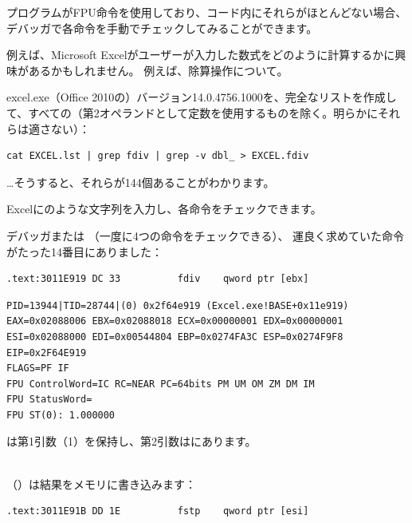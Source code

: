 
プログラムがFPU命令を使用しており、コード内にそれらがほとんどない場合、
デバッガで各命令を手動でチェックしてみることができます。

\par 例えば、Microsoft Excelがユーザーが入力した数式をどのように計算するかに興味があるかもしれません。
例えば、除算操作について。

\myindex{\GrepUsage}

excel.exe（Office 2010の）バージョン14.0.4756.1000を、完全なリストを作成して、すべての（第2オペランドとして定数を使用するものを除く。明らかにそれらは適さない）：

\begin{lstlisting}
cat EXCEL.lst | grep fdiv | grep -v dbl_ > EXCEL.fdiv
\end{lstlisting}

\dots そうすると、それらが144個あることがわかります。

\par Excelにのような文字列を入力し、各命令をチェックできます。


\par デバッガまたは
（一度に4つの命令をチェックできる）、
運良く求めていた命令がたった14番目にありました：

\begin{lstlisting}[style=customasmx86]
.text:3011E919 DC 33          fdiv    qword ptr [ebx]
\end{lstlisting}

\begin{lstlisting}
PID=13944|TID=28744|(0) 0x2f64e919 (Excel.exe!BASE+0x11e919)
EAX=0x02088006 EBX=0x02088018 ECX=0x00000001 EDX=0x00000001
ESI=0x02088000 EDI=0x00544804 EBP=0x0274FA3C ESP=0x0274F9F8
EIP=0x2F64E919
FLAGS=PF IF
FPU ControlWord=IC RC=NEAR PC=64bits PM UM OM ZM DM IM 
FPU StatusWord=
FPU ST(0): 1.000000
\end{lstlisting}

は第1引数（1）を保持し、第2引数は\TT{[EBX]}にあります。\\
\\

（）は結果をメモリに書き込みます：\\

\begin{lstlisting}[style=customasmx86]
.text:3011E91B DD 1E          fstp    qword ptr [esi]
\end{lstlisting}

